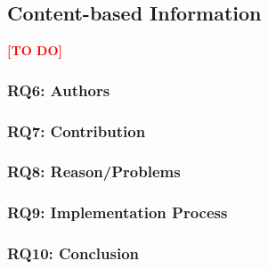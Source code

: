 \clearpage
\subsection{Content-based Information}
\label{subsec:ContentBasedInformation}
\textcolor{red}{\textbf{[TO DO]}}
\subsubsection{RQ6: Authors}
\subsubsection{RQ7: Contribution}
\subsubsection{RQ8: Reason/Problems}
\subsubsection{RQ9: Implementation Process}
\subsubsection{RQ10: Conclusion}

